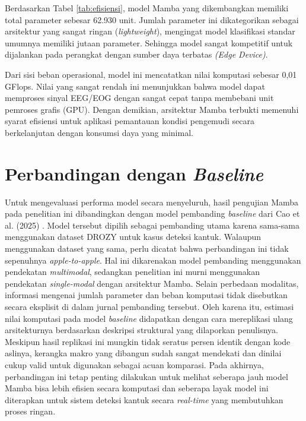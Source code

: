 Berdasarkan Tabel \ref{tab:efisiensi}, model Mamba yang dikembangkan memiliki total parameter sebesar 62.930 unit. Jumlah parameter ini dikategorikan sebagai arsitektur yang sangat ringan (\textit{lightweight}), mengingat model klasifikasi standar umumnya memiliki jutaan parameter. Sehingga model sangat kompetitif untuk dijalankan pada perangkat dengan sumber daya terbatas \textit{(Edge Device)}.

Dari sisi beban operasional, model ini mencatatkan nilai komputasi sebesar 0,01 GFlops. Nilai yang sangat rendah ini menunjukkan bahwa model dapat memproses sinyal EEG/EOG dengan sangat cepat tanpa membebani unit pemroses grafis (GPU). Dengan demikian, arsitektur Mamba terbukti memenuhi syarat efisiensi untuk aplikasi pemantauan kondisi pengemudi secara berkelanjutan dengan konsumsi daya yang minimal.

\section{Perbandingan dengan \textit{Baseline}}
Untuk mengevaluasi performa model secara menyeluruh, hasil pengujian Mamba pada penelitian ini dibandingkan dengan model pembanding \textit{baseline} dari Cao et al. (2025) \cite{Cao2025Optimized}. Model tersebut dipilih sebagai pembanding utama karena sama-sama menggunakan dataset DROZY \cite{Massoz2016} untuk kasus deteksi kantuk. Walaupun menggunakan dataset yang sama, perlu dicatat bahwa perbandingan ini tidak sepenuhnya \textit{apple-to-apple}. %
Hal ini dikarenakan model pembanding menggunakan pendekatan \textit{multimodal}, sedangkan penelitian ini murni menggunakan pendekatan \textit{single-modal} dengan arsitektur Mamba. Selain perbedaan modalitas, informasi mengenai jumlah parameter dan beban komputasi tidak disebutkan secara eksplisit di dalam jurnal pembanding tersebut. Oleh karena itu, estimasi nilai komputasi pada model \textit{baseline} didapatkan dengan cara mereplikasi ulang arsitekturnya berdasarkan deskripsi struktural yang dilaporkan penulisnya. Meskipun hasil replikasi ini mungkin tidak seratus persen identik dengan kode aslinya, kerangka makro yang dibangun sudah sangat mendekati dan dinilai cukup valid untuk digunakan sebagai acuan komparasi. Pada akhirnya, perbandingan ini tetap penting dilakukan untuk melihat seberapa jauh model Mamba bisa lebih efisien secara komputasi dan seberapa layak model ini diterapkan untuk sistem deteksi kantuk secara \textit{real-time} yang membutuhkan proses ringan. %

